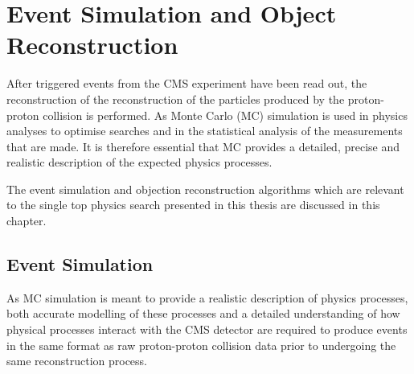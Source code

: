 \chapter{Event Simulation and Object Reconstruction}\label{chapter:data-mc}
After triggered events from the CMS experiment have been read out, the reconstruction of the reconstruction of the particles produced by the proton-proton collision is performed.
As Monte Carlo (MC) simulation is used in physics analyses to optimise searches and in the statistical analysis of the measurements that are made.
It is therefore essential that MC provides a detailed, precise and realistic description of the expected physics processes.
 
The event simulation and objection reconstruction algorithms which are relevant to the single top physics search presented in this thesis are discussed in this chapter.

\section{Event Simulation}\label{sec:sim}
As MC simulation is meant to provide a realistic description of physics processes, both accurate modelling of these processes and a detailed understanding of how physical processes interact with the CMS detector are required to produce events in the same format as raw proton-proton collision data prior to undergoing the same reconstruction process.


%
%
%
%
%
%
%
%
%
%


